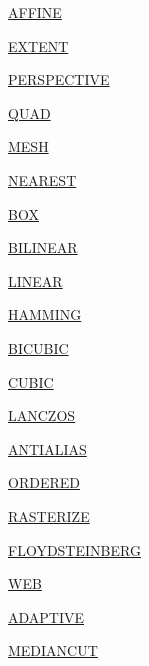 \begin{DoxyCompactItemize}
\item 
\hyperlink{namespacePIL_1_1Image_add4f29dba81900a3fdaa8af3905b9858}{A\+F\+F\+I\+NE}
\item 
\hyperlink{namespacePIL_1_1Image_af3ed41655c1a8f40e779701ac31d01f6}{E\+X\+T\+E\+NT}
\item 
\hyperlink{namespacePIL_1_1Image_a59b6baf73938ac7ebc96e7b28116f1a1}{P\+E\+R\+S\+P\+E\+C\+T\+I\+VE}
\item 
\hyperlink{namespacePIL_1_1Image_a3c2a674d1ea6fafeeb75a2c47c00a0ab}{Q\+U\+AD}
\item 
\hyperlink{namespacePIL_1_1Image_a8886ca043594a05f53fd5a661b82ae68}{M\+E\+SH}
\item 
\hyperlink{namespacePIL_1_1Image_afd842ab6c443c96339eb08e18ba4d206}{N\+E\+A\+R\+E\+ST}
\item 
\hyperlink{namespacePIL_1_1Image_a26f77461ba3bd81606b77001147c0123}{B\+OX}
\item 
\hyperlink{namespacePIL_1_1Image_ad4b661d0dee54be6240599760dcf45c8}{B\+I\+L\+I\+N\+E\+AR}
\item 
\hyperlink{namespacePIL_1_1Image_a2d10c0bd05e56ec4795ce8d7a454ff5d}{L\+I\+N\+E\+AR}
\item 
\hyperlink{namespacePIL_1_1Image_a2d37c11e8fb29aee0dabdeca3327e537}{H\+A\+M\+M\+I\+NG}
\item 
\hyperlink{namespacePIL_1_1Image_a3824ac5a0532aa60f7072af889d88e59}{B\+I\+C\+U\+B\+IC}
\item 
\hyperlink{namespacePIL_1_1Image_a0f854d05eca58d71e09b80ae48a12b2b}{C\+U\+B\+IC}
\item 
\hyperlink{namespacePIL_1_1Image_ade23d2c21dd75de08470b5dda4590065}{L\+A\+N\+C\+Z\+OS}
\item 
\hyperlink{namespacePIL_1_1Image_a40c89e5149cc8324352625e073b4ffd7}{A\+N\+T\+I\+A\+L\+I\+AS}
\item 
\hyperlink{namespacePIL_1_1Image_a1c6f020d524ad564128218ab84e1f24c}{O\+R\+D\+E\+R\+ED}
\item 
\hyperlink{namespacePIL_1_1Image_a5cc3a56d6715db64facb400990495169}{R\+A\+S\+T\+E\+R\+I\+ZE}
\item 
\hyperlink{namespacePIL_1_1Image_a03aaee6ce61501ce1f6b6ef08d82cffa}{F\+L\+O\+Y\+D\+S\+T\+E\+I\+N\+B\+E\+RG}
\item 
\hyperlink{namespacePIL_1_1Image_ac8a45c0e04c437394a776b8ade4c0912}{W\+EB}
\item 
\hyperlink{namespacePIL_1_1Image_ac464da79ce0de803656e1ef170b7d970}{A\+D\+A\+P\+T\+I\+VE}
\item 
\hyperlink{namespacePIL_1_1Image_aeab76f5ba15a9a1fbd2f212fc98c80dd}{M\+E\+D\+I\+A\+N\+C\+UT}

\end{DoxyCompactItemize}
